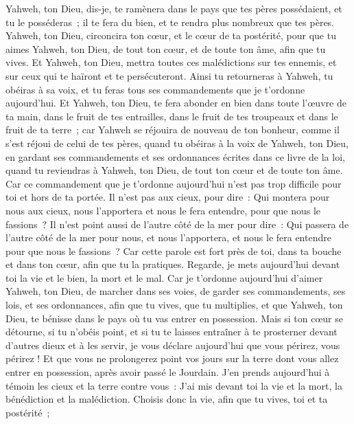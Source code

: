 \begin{multicols}{2}
Yahweh, ton Dieu, dis-je, te ramènera dans le pays que tes pères possédaient, et tu le posséderas~; il te fera du bien, et te rendra plus nombreux que tes pères.
Yahweh, ton Dieu, circoncira ton cœur, et le cœur de ta postérité, pour que tu aimes Yahweh, ton Dieu, de tout ton cœur, et de toute ton âme, afin que tu vives.
Et Yahweh, ton Dieu, mettra toutes ces malédictions sur tes ennemis, et sur ceux qui te haïront et te persécuteront.
Ainsi tu retourneras à Yahweh, tu obéiras à sa voix, et tu feras tous ses commandements que je t'ordonne aujourd'hui.
Et Yahweh, ton Dieu, te fera abonder en bien dans toute l'œuvre de ta main, dans le fruit de tes entrailles, dans le fruit de tes troupeaux et dans le fruit de ta terre~; car Yahweh se réjouira de nouveau de ton bonheur, comme il s'est réjoui de celui de tes pères,
quand tu obéiras à la voix de Yahweh, ton Dieu, en gardant ses commandements et ses ordonnances écrites dans ce livre de la loi, quand tu reviendras à Yahweh, ton Dieu, de tout ton cœur et de toute ton âme.
Car ce commandement que je t'ordonne aujourd'hui n'est pas trop difficile pour toi et hors de ta portée.
Il n'est pas aux cieux, pour dire~: Qui montera pour nous aux cieux, nous l'apportera et nous le fera entendre, pour que nous le fassions~?
Il n'est point aussi de l'autre côté de la mer pour dire~: Qui passera de l'autre côté de la mer pour nous, et nous l'apportera, et nous le fera entendre pour que nous le fassions~?
Car cette parole est fort près de toi, dans ta bouche et dans ton cœur, afin que tu la pratiques.
Regarde, je mets aujourd'hui devant toi la vie et le bien, la mort et le mal.
Car je t'ordonne aujourd'hui d'aimer Yahweh, ton Dieu, de marcher dans ses voies, de garder ses commandements, ses lois, et ses ordonnances, afin que tu vives, que tu multiplies, et que Yahweh, ton Dieu, te bénisse dans le pays où tu vas entrer en possession.
Mais si ton cœur se détourne, si tu n'obéis point, et si tu te laisses entraîner à te prosterner devant d'autres dieux et à les servir,
je vous déclare aujourd'hui que vous périrez, vous périrez ! Et que vous ne prolongerez point vos jours sur la terre dont vous allez entrer en possession, après avoir passé le Jourdain.
J'en prends aujourd'hui à témoin les cieux et la terre contre vous~: J'ai mis devant toi la vie et la mort, la bénédiction et la malédiction. Choisis donc la vie, afin que tu vives, toi et ta postérité~;

\end{multicols}
